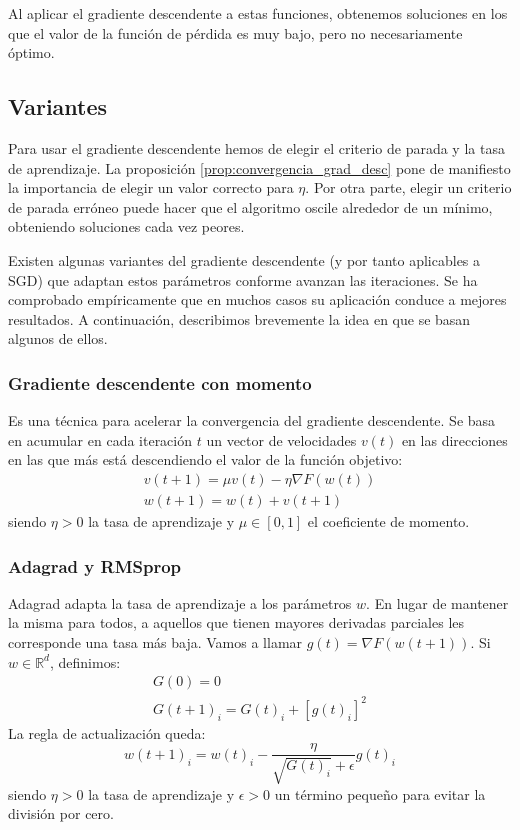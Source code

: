 Al aplicar el gradiente descendente a estas funciones, obtenemos soluciones en los que el valor de la función de pérdida es muy bajo, pero no necesariamente óptimo.

\subsection{Variantes}
Para usar el gradiente descendente hemos de elegir el criterio de parada y la tasa de aprendizaje. La proposición \ref{prop:convergencia_grad_desc} pone de manifiesto la importancia de elegir un valor correcto para $\eta$. Por otra parte, elegir un criterio de parada erróneo puede hacer que el algoritmo oscile alrededor de un mínimo, obteniendo soluciones cada vez peores.

Existen algunas variantes del gradiente descendente (y por tanto aplicables a SGD) que adaptan estos parámetros conforme avanzan las iteraciones. Se ha comprobado empíricamente que en muchos casos su aplicación conduce a mejores resultados. A continuación, describimos brevemente la idea en que se basan algunos de ellos. 

\subsubsection{Gradiente descendente con momento}
Es una técnica para acelerar la convergencia del gradiente descendente. Se basa en acumular en cada iteración $t$ un vector de velocidades $v(t)$ en las direcciones en las que más está descendiendo el valor de la función objetivo:
\begin{gather*}
	v(t+1) = \mu v(t) - \eta \nabla F(w(t))\\
	w(t+1) = w(t) + v(t+1)
\end{gather*}
siendo $\eta > 0$ la tasa de aprendizaje y $\mu \in [0,1]$ el coeficiente de momento. 

\subsubsection{Adagrad y RMSprop}
Adagrad adapta la tasa de aprendizaje a los parámetros $w$. En lugar de mantener la misma para todos, a aquellos que tienen mayores derivadas parciales les corresponde una tasa más baja. Vamos a llamar $g(t) = \nabla F(w(t+1)) $. Si $w \in \mathbb{R}^d$, definimos:
\begin{gather*}
	G(0) = 0\\
	G(t+1)_{i} = G(t)_{i} + [ g(t)_{i} ]^2
\end{gather*}
La regla de actualización queda:
$$ w(t+1)_{i} = w(t)_{i} - \dfrac{\eta}{\sqrt{G(t)_{i}} + \epsilon} g(t)_{i} $$
siendo $\eta > 0$ la tasa de aprendizaje y $\epsilon > 0$ un término pequeño para evitar la división por cero.

